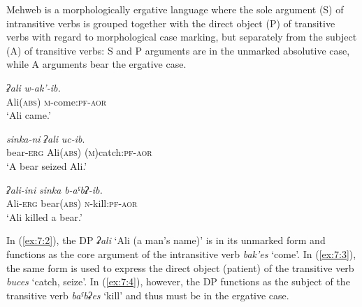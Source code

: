 ﻿\documentclass[output=paper]{langsci/langscibook}
\begin{document}
Mehweb is a morphologically ergative language where the sole argument
(S) of intransitive verbs is grouped together with the direct object (P)
of transitive verbs with regard to morphological case marking, but
separately from the subject (A) of transitive verbs: S and P arguments
are in the unmarked absolutive case, while A arguments bear the ergative
case.

\ea \label{ex:7:2} %
\gll \emph{ʡali} \emph{w-ak'-ib.}\\
Ali(\textsc{abs}) \textsc{m}-come:\textsc{pf}-\textsc{aor}\\
\glt `Ali came.'

\ex \label{ex:7:3} %
\gll \emph{sinka-ni} \emph{ʡali} \emph{uc-ib}.\\
bear-\textsc{erg} Ali(\textsc{abs}) (\textsc{m})catch:\textsc{pf}-\textsc{aor}\\
\glt `A bear seized Ali.'

\ex \label{ex:7:4} %
\gll \emph{ʡali-ini} \emph{sinka} \emph{b-aˤbʡ-ib.}\\
Ali-\textsc{erg} bear(\textsc{abs}) \textsc{n}-kill:\textsc{pf}-\textsc{aor}\\
\glt `Ali killed a bear.'
\z

In (\ref{ex:7:2}), the DP \emph{ʡali} `Ali (a man's name)' is in its unmarked form
and functions as the core argument of the intransitive verb
\emph{bak'es} `come'. In (\ref{ex:7:3}), the same form is used to express the
direct object (patient) of the transitive verb \emph{buces} `catch,
seize'. In (\ref{ex:7:4}), however, the DP functions as the subject of the
transitive verb \emph{baˤbʡes} `kill' and thus must be in the ergative
case.
\end{document}
